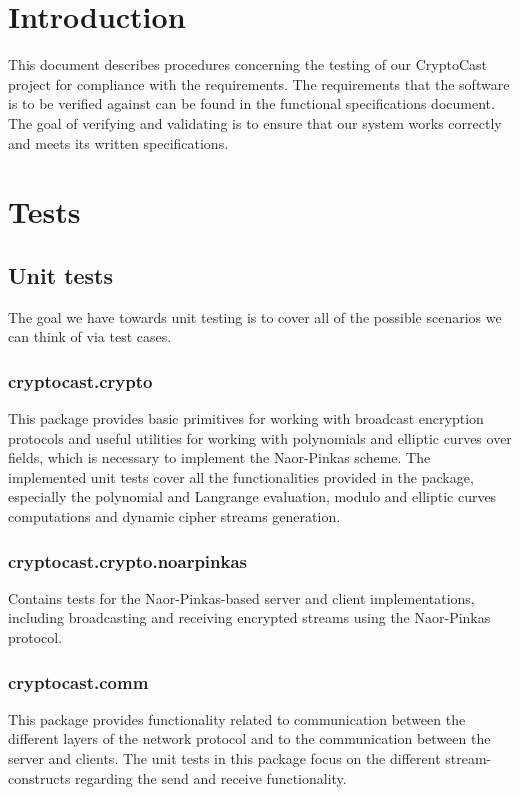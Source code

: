 \documentclass[a4paper,10pt]{scrartcl}
\title{\doctitle}
\author{\authorName}
\date{\today}
\begin{document}

\tableofcontents
\clearpage

\section{Introduction}
This document describes procedures concerning the testing of our CryptoCast project for compliance with the requirements. The requirements that the software is to be verified against can be found in the functional specifications document. The goal of verifying and validating is to ensure that our system works correctly and meets its written specifications.

\section{Tests}
\subsection{Unit tests}
The goal we have towards unit testing is to cover all of the possible scenarios we can think of via test cases.

\subsubsection{cryptocast.crypto} This package provides basic primitives for working with broadcast encryption protocols and useful utilities for working with polynomials and elliptic curves over fields, which is necessary to implement the Naor-Pinkas scheme.
The implemented unit tests cover all the functionalities provided in the package, especially the polynomial and Langrange evaluation, modulo and elliptic curves computations and dynamic cipher streams generation.
\subsubsection{cryptocast.crypto.noarpinkas}
Contains tests for the Naor-Pinkas-based server and client implementations, including broadcasting and receiving encrypted streams using the Naor-Pinkas protocol.
\subsubsection{cryptocast.comm}
This package provides functionality related to communication between the different layers of the network protocol and to the communication between the server and clients. The unit tests in this package focus on the different stream-constructs regarding the send and receive functionality.
\end{document}
